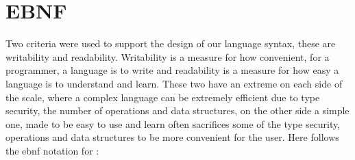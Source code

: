 \begin{comment}
\section{EBNF}
To explain the language syntax, an \emph{EBNF} notation is used.
EBNF is an abbreviation for \emph{Extended Backus-Naur form} and is a modified version of \emph{BNF} (Backus-Naur form).
EBNF is a notation technique to describe the syntax of languages and is often used for computer programming languages. EBNF is a set of derivation rules, meaning that a 'word' on the left side (called a non-terminal) is substituted with the words on the right side.\\
Example:\\
{\begin{lstlisting}[numbers=none]
full-name = name, last-name, $ | name, full-name

name> = first-name | middle-name
\end{lstlisting}}
Translation:
\begin{itemize}
	\item A full-name consists of a name, followed by a last-name and end-of-line, or a name, followed by full-name.
	\item A name consists of a first-name or a middle-name
\end{itemize}
\pagebreak
\end{comment}


\section{\langname{} EBNF}

Two criteria were used to support the design of our language syntax, these are writability and readability. Writability is a measure for how convenient, for a programmer, a language is to write and readability is a measure for how easy a language is to understand and learn. These two have an extreme on each side of the scale, where a complex language can be extremely efficient due to type security, the number of operations and data structures, on the other side a simple one, made to be easy to use and learn often sacrifices some of the type security, operations and data structures to be more convenient for the user.
Here follows the \ac{ebnf} notation for \langname{}:

